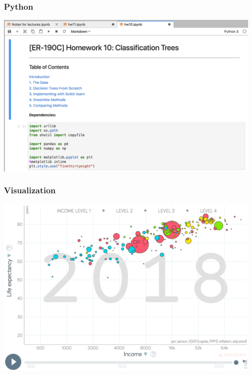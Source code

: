 \documentclass[mathserif, aspectratio=169]{beamer}
\begin{document}
\begin{frame}
	\frametitle{Python}
	\includegraphics[height=\textheight]{python}
\end{frame}

\begin{frame}
	\frametitle{Visualization}
	\begin{center}
		\includegraphics[height=0.9\textheight]{pop-income}
	\end{center}
\end{frame}
\end{document}
